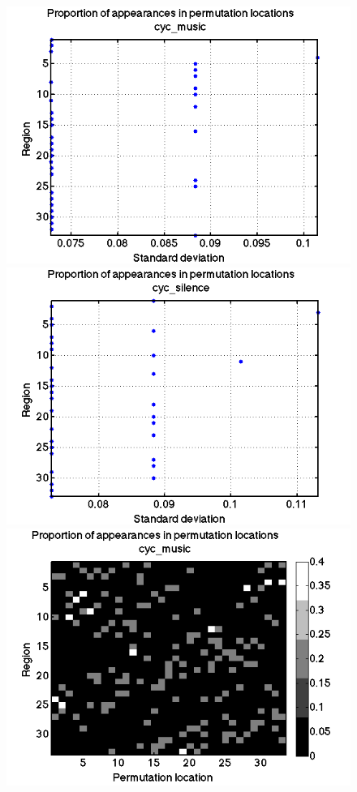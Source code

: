 \documentclass[11pt]{article}
\begin{document}
	\begin{figure}[H]
		\centering
		\newcommand\w{.49}
		\includegraphics[width=\w\linewidth]{pictures/dodPilots/cyc_music_permLocationsstd.png}
		\includegraphics[width=\w\linewidth]{pictures/dodPilots/cyc_silence_permLocationsstd.png}
		\includegraphics[width=\w\linewidth]{pictures/dodPilots/cyc_music_permLocationsgray.png}

\end{figure}
\end{document}
